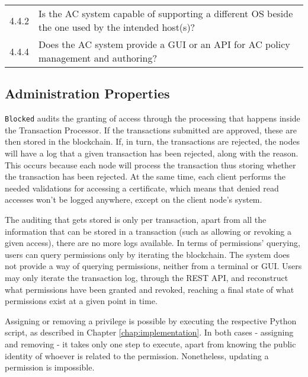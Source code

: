 {\begin{table}[h]
\begin{tabular}{l|l}
		\hline \rowcolor{lightgray} \multicolumn{2}{l}{Support Properties}                                                                         \\ \hline
		4.4.2              & \llap{\textbullet} Is the AC system capable of supporting a different OS beside the one used by the intended host(s)? \\ \hline
		4.4.4              & \llap{\textbullet} Does the AC system provide a GUI or an API for AC policy management and authoring?                 \\
		\hline
	\end{tabular}
\end{table}
}

\subsection{Administration Properties}

\texttt{Blocked} audits the granting of access through the processing that happens inside the Transaction Processor. If the transactions submitted are approved, these are then stored in the blockchain. If, in turn, the transactions are rejected, the nodes will have a log that a given transaction has been rejected, along with the reason. This occurs because each node will process the transaction thus storing whether the transaction has been rejected. At the same time, each client performs the needed validations for accessing a certificate, which means that denied read accesses won't be logged anywhere, except on the client node's system.

The auditing that gets stored is only per transaction, apart from all the information that can be stored in a transaction (such as allowing or revoking a given access), there are no more logs available.  In terms of permissions' querying, users can query permissions only by iterating the blockchain. The system does not provide a way of querying permissions, neither from a terminal or GUI. Users may only iterate the transaction log, through the REST API, and reconstruct what permissions have been granted and revoked, reaching a final state of what permissions exist at a given point in time.

Assigning or removing a privilege is possible by executing the respective Python script, as described in Chapter \ref{chap:implementation}. In both cases - assigning and removing - it takes only one step to execute, apart from knowing the public identity of whoever is related to the permission. Nonetheless, updating a permission is impossible.


